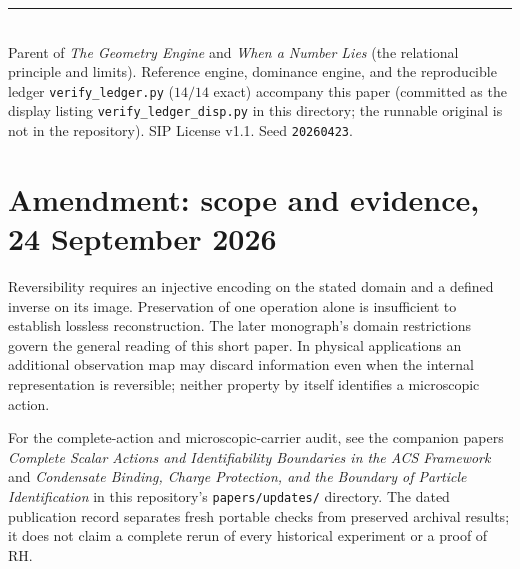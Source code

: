 \documentclass[11pt]{article}
\begin{document}
\vspace{1em}\noindent\rule{\linewidth}{0.4pt}\\
\small Parent of \textit{The Geometry Engine} and \textit{When a Number Lies} (the relational principle and limits). Reference
engine, dominance engine, and the reproducible ledger \texttt{verify\_ledger.py} ($14/14$ exact) accompany
this paper (committed as the display listing \texttt{verify\_ledger\_disp.py} in this directory;
the runnable original is not in the repository). SIP License v1.1. Seed \texttt{20260423}.


\section*{Amendment: scope and evidence, 24 September 2026}
Reversibility requires an injective encoding on the stated domain and a defined inverse on its image. Preservation of one operation alone is insufficient to establish lossless reconstruction. The later monograph's domain restrictions govern the general reading of this short paper. In physical applications an additional observation map may discard information even when the internal representation is reversible; neither property by itself identifies a microscopic action.

For the complete-action and microscopic-carrier audit, see the companion
papers \emph{Complete Scalar Actions and Identifiability Boundaries in the ACS
Framework} and \emph{Condensate Binding, Charge Protection, and the Boundary
of Particle Identification} in this repository's \texttt{papers/updates/}
directory. The dated publication record separates fresh portable checks
from preserved archival results; it does not claim a complete rerun of every
historical experiment or a proof of RH.
\end{document}
